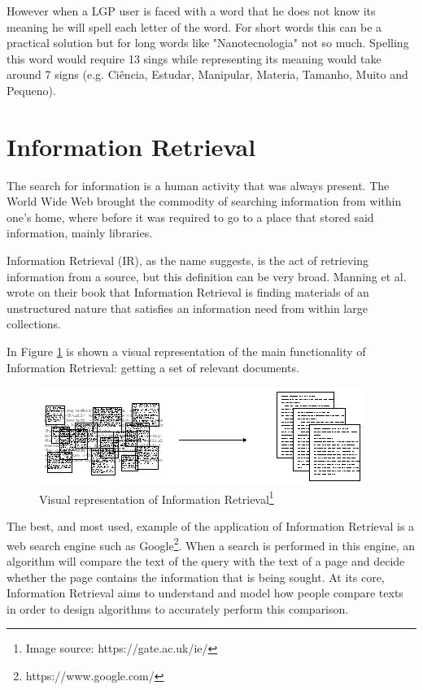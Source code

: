 However when a \gls{LGP} user is faced with a word that he does not know its meaning he will spell each letter of the word.
For short words this can be a practical solution but for long words like "Nanotecnologia" not so much.
Spelling this word would require 13 sings while representing its meaning would take around 7 signs (e.g. Ciência, Estudar, Manipular, Materia, Tamanho, Muito and Pequeno).

\section{Information Retrieval}

The search for information is a human activity that was always present.
The World Wide Web brought the commodity of searching information from within one's home, where before it was required to go to a place that stored said information, mainly libraries.

Information Retrieval (IR), as the name suggests, is the act of retrieving information from a source, but this definition can be very broad.
Manning et al.\cite{manning2008introduction} wrote on their book that Information Retrieval is finding materials of an unstructured nature that satisfies an information need from within large collections.

In Figure \ref{fig:iret} is shown a visual representation of the main functionality of Information Retrieval: getting a set of relevant documents.
\begin{figure}[H]
\centering
\includegraphics[scale=0.65]{ch2/assets/retrieve.png}
    \caption[InformationRetrival]{Visual representation of Information Retrieval\footnote{Image source: https://gate.ac.uk/ie/}}
\label{fig:iret}
\end{figure}

The best, and most used, example of the application of Information Retrieval is a web search engine such as Google\footnote{https://www.google.com/}.
When a search is performed in this engine, an algorithm will compare the text of the query with the text of a page and decide whether the page contains the information that is being sought.
At its core, Information Retrieval aims to understand and model how people compare texts in order to design algorithms to accurately perform this comparison\cite{croft2010search}.

